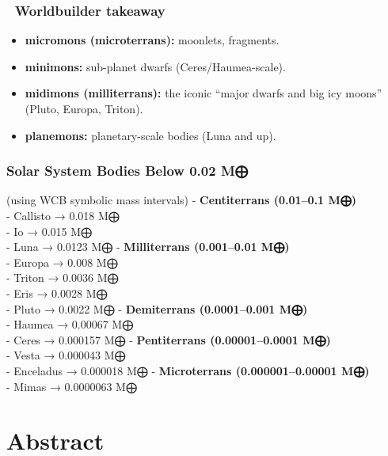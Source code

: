 \documentclass[
  letterpaper,
]{book}
\providecommand{\tightlist}{%
  \setlength{\itemsep}{0pt}\setlength{\parskip}{0pt}}
\begin{document}
\subsection{\texorpdfstring{📖 \textbf{Worldbuilder
takeaway}}{📖 Worldbuilder takeaway}}\label{worldbuilder-takeaway}

\begin{itemize}
\tightlist
\item
  \textbf{micromons (microterrans):} moonlets, fragments.\\
\item
  \textbf{minimons:} sub-planet dwarfs (Ceres/Haumea-scale).\\
\item
  \textbf{midimons (milliterrans):} the iconic ``major dwarfs and big
  icy moons'' (Pluto, Europa, Triton).\\
\item
  \textbf{planemons:} planetary-scale bodies (Luna and up).
\end{itemize}

\subsection{\texorpdfstring{\textbf{Solar System Bodies Below 0.02
M⨁}}{Solar System Bodies Below 0.02 M⨁}}\label{solar-system-bodies-below-0.02-m}

(using WCB symbolic mass intervals) - \textbf{Centiterrans (0.01--0.1
M⨁)}\\
- Callisto → 0.018 M⨁\\
- Io → 0.015 M⨁\\
- Luna → 0.0123 M⨁ - \textbf{Milliterrans (0.001--0.01 M⨁)}\\
- Europa → 0.008 M⨁\\
- Triton → 0.0036 M⨁\\
- Eris → 0.0028 M⨁\\
- Pluto → 0.0022 M⨁ - \textbf{Demiterrans (0.0001--0.001 M⨁)}\\
- Haumea → 0.00067 M⨁\\
- Ceres → 0.000157 M⨁ - \textbf{Pentiterrans (0.00001--0.0001 M⨁)}\\
- Vesta → 0.000043 M⨁\\
- Enceladus → 0.000018 M⨁ - \textbf{Microterrans (0.000001--0.00001
M⨁)}\\
- Mimas → 0.0000063 M⨁

\chapter{Abstract}\label{abstract-5}
\end{document}
